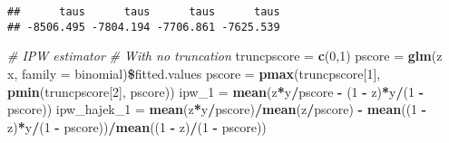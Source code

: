 \documentclass[]{article}
\newenvironment{Shaded}{\begin{snugshade}}{\end{snugshade}}
\newcommand{\KeywordTok}[1]{\textcolor[rgb]{0.13,0.29,0.53}{\textbf{#1}}}
\newcommand{\DataTypeTok}[1]{\textcolor[rgb]{0.13,0.29,0.53}{#1}}
\newcommand{\DecValTok}[1]{\textcolor[rgb]{0.00,0.00,0.81}{#1}}
\newcommand{\StringTok}[1]{\textcolor[rgb]{0.31,0.60,0.02}{#1}}
\newcommand{\CommentTok}[1]{\textcolor[rgb]{0.56,0.35,0.01}{\textit{#1}}}
\newcommand{\OperatorTok}[1]{\textcolor[rgb]{0.81,0.36,0.00}{\textbf{#1}}}
\newcommand{\NormalTok}[1]{#1}
\begin{document}
\begin{verbatim}
##      taus      taus      taus      taus 
## -8506.495 -7804.194 -7706.861 -7625.539
\end{verbatim}

\begin{Shaded}
\begin{Highlighting}[]
\CommentTok{# IPW estimator}
\CommentTok{# With no truncation}
\NormalTok{truncpscore =}\StringTok{ }\KeywordTok{c}\NormalTok{(}\DecValTok{0}\NormalTok{,}\DecValTok{1}\NormalTok{)}
\NormalTok{pscore =}\StringTok{ }\KeywordTok{glm}\NormalTok{(z }\OperatorTok{~}\StringTok{ }\NormalTok{x, }\DataTypeTok{family =}\NormalTok{ binomial)}\OperatorTok{\$}\NormalTok{fitted.values}
\NormalTok{pscore =}\StringTok{ }\KeywordTok{pmax}\NormalTok{(truncpscore[}\DecValTok{1}\NormalTok{], }\KeywordTok{pmin}\NormalTok{(truncpscore[}\DecValTok{2}\NormalTok{], pscore))}
\NormalTok{ipw_}\DecValTok{1}\NormalTok{ =}\StringTok{ }\KeywordTok{mean}\NormalTok{(z}\OperatorTok{*}\NormalTok{y}\OperatorTok{/}\NormalTok{pscore }\OperatorTok{-}\StringTok{ }\NormalTok{(}\DecValTok{1} \OperatorTok{-}\StringTok{ }\NormalTok{z)}\OperatorTok{*}\NormalTok{y}\OperatorTok{/}\NormalTok{(}\DecValTok{1} \OperatorTok{-}\StringTok{ }\NormalTok{pscore))}
\NormalTok{ipw_hajek_}\DecValTok{1}\NormalTok{ =}\StringTok{ }\KeywordTok{mean}\NormalTok{(z}\OperatorTok{*}\NormalTok{y}\OperatorTok{/}\NormalTok{pscore)}\OperatorTok{/}\KeywordTok{mean}\NormalTok{(z}\OperatorTok{/}\NormalTok{pscore) }\OperatorTok{-}\StringTok{ }\KeywordTok{mean}\NormalTok{((}\DecValTok{1} \OperatorTok{-}\StringTok{ }\NormalTok{z)}\OperatorTok{*}\NormalTok{y}\OperatorTok{/}\NormalTok{(}\DecValTok{1} \OperatorTok{-}\StringTok{ }\NormalTok{pscore))}\OperatorTok{/}\KeywordTok{mean}\NormalTok{((}\DecValTok{1} \OperatorTok{-}\StringTok{ }\NormalTok{z)}\OperatorTok{/}\NormalTok{(}\DecValTok{1} \OperatorTok{-}\StringTok{ }\NormalTok{pscore))}


\end{Highlighting}
\end{Shaded}
\end{document}
